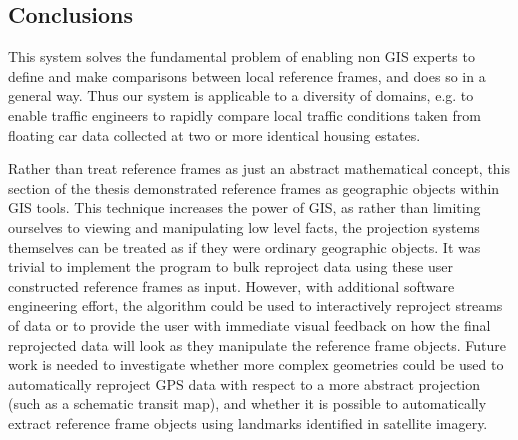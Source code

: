 \subsection{Conclusions}\label{conclusion-sigspatial}


This system solves the fundamental problem of enabling non GIS experts to define and make comparisons between local reference frames, and does so in a general way. Thus our system is applicable to a diversity of domains, e.g. to enable traffic engineers to rapidly compare local traffic conditions taken from floating car data collected at two or more identical housing estates.

Rather than treat reference frames as just an abstract mathematical concept, this section of the thesis demonstrated reference frames as geographic objects within GIS tools. This technique increases the power of GIS, as rather than limiting ourselves to viewing and manipulating low level facts, the projection systems themselves can be treated as if they were ordinary geographic objects. It was trivial to implement the program to bulk reproject data using these user constructed reference frames as input. However, with additional software engineering effort, the algorithm could be used to interactively reproject streams of data or to provide the user with immediate visual feedback on how the final reprojected data will look as they manipulate the reference frame objects. Future work is needed to investigate whether more complex geometries could be used to automatically reproject GPS data with respect to a more abstract projection (such as a schematic transit map), and whether it is possible to automatically extract reference frame objects using landmarks identified in satellite imagery.
